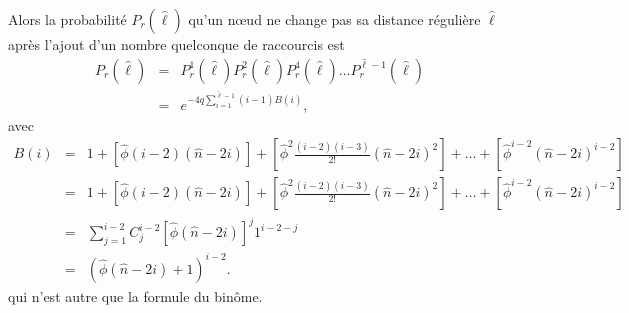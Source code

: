 Alors la probabilité $P_r(\hat{\ell})$ qu'un nœud ne change pas sa distance régulière $\hat{\ell}$ après l'ajout d'un nombre quelconque de raccourcis est
\begin{eqnarray}
P_r(\hat{\ell})&=&P^1_r(\hat{\ell})P^2_r(\hat{\ell})P^4_r(\hat{\ell})\ldots P^{\hat{\ell}-1}_r(\hat{\ell})\\\nonumber
&=&e^{-4q\sum_{i=1}^{\hat{\ell}-1}(i-1)B(i)}, 
\end{eqnarray}
avec
\begin{eqnarray}
B(i)&=&1+[\hat{\phi}(i-2)(\hat{n}-2i)]+[\hat{\phi}^2\frac{(i-2)(i-3)}{2!}(\hat{n}-2i)^{2}]+\ldots+[\hat{\phi}^{i-2}(\hat{n}-2i)^{i-2}]\nonumber \\ \nonumber
	&=&1+[\hat{\phi}(i-2)(\hat{n}-2i)]+[\hat{\phi}^2\frac{(i-2)(i-3)}{2!}(\hat{n}-2i)^{2}]+\ldots+[\hat{\phi}^{i-2}(\hat{n}-2i)^{i-2}]\\ \nonumber
&=&\sum_{j=1}^{i-2}C_j^{i-2}[\hat{\phi}(\hat{n}-2i)]^j1^{i-2-j}\\ \nonumber 
&=&(\hat{\phi}(\hat{n}-2i)+1)^{i-2}.
\end{eqnarray}
qui n'est autre que la formule du binôme.
